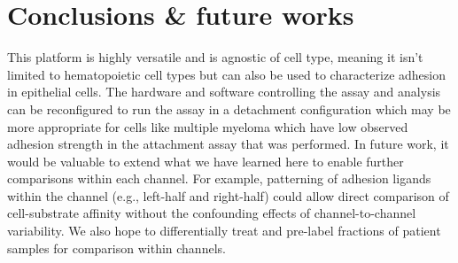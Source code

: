\section{Conclusions \& future works}

This platform is highly versatile and is agnostic of cell type, meaning it isn't limited to hematopoietic cell types but can also be used to characterize adhesion in epithelial cells. The hardware and software controlling the assay and analysis can be reconfigured to run the assay in a detachment configuration which may be more appropriate for cells like multiple myeloma which have low observed adhesion strength in the attachment assay that was performed. In future work, it would be valuable to extend what we have learned here to enable further comparisons within each channel. For example, patterning of adhesion ligands within the channel (e.g., left-half and right-half) could allow direct comparison of cell-substrate affinity without the confounding effects of channel-to-channel variability. We also hope to differentially treat and pre-label fractions of patient samples for comparison within channels.